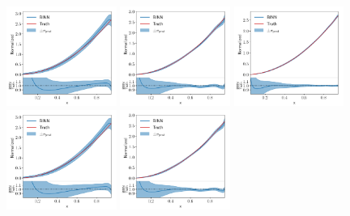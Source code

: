 \begin{figure}[t]
\centering
\includegraphics[width=0.32\textwidth, page=1]{./figures/bINN/training_size_10k}
\includegraphics[width=0.32\textwidth, page=1]{./figures/bINN/training_size_100k}
\includegraphics[width=0.32\textwidth, page=1]{./figures/bINN/training_size_1M} \\
\includegraphics[width=0.32\textwidth, page=2]{./figures/bINN/training_size_10k}
\includegraphics[width=0.32\textwidth, page=2]{./figures/bINN/training_size_100k}

\end{figure}
